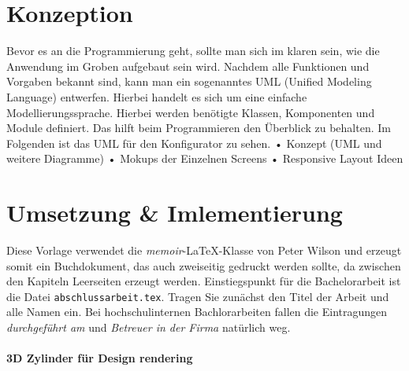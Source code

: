 \section{Konzeption}
\label{sec:konzept}
%
Bevor es an die Programmierung geht, sollte man sich im klaren sein, wie die Anwendung im Groben aufgebaut sein wird. Nachdem alle Funktionen und Vorgaben bekannt sind, kann man ein sogenanntes UML (Unified Modeling Language) entwerfen. Hierbei handelt es sich um eine einfache Modellierungssprache. Hierbei werden benötigte Klassen, Komponenten und Module definiert. Das hilft beim Programmieren den Überblick zu behalten. Im Folgenden  ist das UML für den Konfigurator zu sehen.
• Konzept (UML und weitere Diagramme)
• Mokups der Einzelnen Screens
• Responsive Layout Ideen \\
%
%
%
%
%
\section{Umsetzung \& Imlementierung}
\label{sec:umsetzung}
%
Diese Vorlage verwendet die \textit{memoir}-LaTeX-Klasse von Peter Wilson und erzeugt somit ein Buchdokument, das auch zweiseitig gedruckt werden sollte, da zwischen den Kapiteln Leerseiten erzeugt werden. Einstiegspunkt für die Bachelorarbeit ist die Datei \texttt{abschlussarbeit.tex}. Tragen Sie zunächst den Titel der Arbeit und alle Namen ein. Bei hochschulinternen Bachlorarbeiten fallen die Eintragungen \textit{durchgeführt am} und \textit{Betreuer in der Firma} natürlich weg. 
\paragraph{3D Zylinder für Design rendering}
